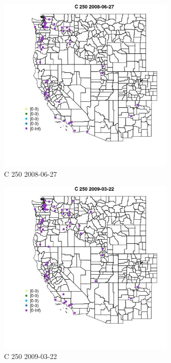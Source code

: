 \begin{figure} 
\centering  
\includegraphics[width=0.77\textwidth]{Code_Outputs/Report_ML_input_PM25_Step4_part_e_de_duplicated_aves_MapObsC_2502008-06-27.jpg} 
\caption{\label{fig:Report_ML_input_PM25_Step4_part_e_de_duplicated_avesMapObsC_2502008-06-27}C 250 2008-06-27} 
\end{figure} 
 

\begin{figure} 
\centering  
\includegraphics[width=0.77\textwidth]{Code_Outputs/Report_ML_input_PM25_Step4_part_e_de_duplicated_aves_MapObsC_2502009-03-22.jpg} 
\caption{\label{fig:Report_ML_input_PM25_Step4_part_e_de_duplicated_avesMapObsC_2502009-03-22}C 250 2009-03-22} 
\end{figure} 
 

